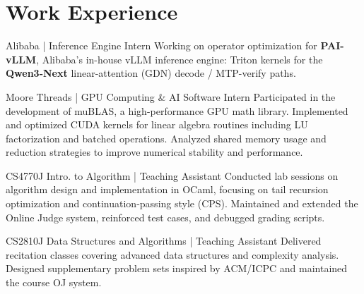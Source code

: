 
\section{Work Experience}

\begin{jobshort}{Alibaba | Inference Engine Intern}{\DateAlibabaEn}
Working on operator optimization for \textbf{PAI-vLLM}, Alibaba's in-house vLLM inference engine: Triton kernels for the \textbf{Qwen3-Next} linear-attention (GDN) decode / MTP-verify paths.
\end{jobshort}

\begin{jobshort}{Moore Threads | GPU Computing \& AI Software Intern}{\DateMooreEn}
Participated in the development of muBLAS, a high-performance GPU math library. 
Implemented and optimized CUDA kernels for linear algebra routines including LU factorization and batched operations. 
Analyzed shared memory usage and reduction strategies to improve numerical stability and performance.
\end{jobshort}

\begin{jobshort}{CS4770J Intro. to Algorithm | Teaching Assistant}{\DateTAEn}
Conducted lab sessions on algorithm design and implementation in OCaml, focusing on tail recursion optimization and continuation-passing style (CPS). 
Maintained and extended the Online Judge system, reinforced test cases, and debugged grading scripts.
\end{jobshort}

\begin{jobshort}{CS2810J Data Structures and Algorithms | Teaching Assistant}{\DateTAEn}
Delivered recitation classes covering advanced data structures and complexity analysis. 
Designed supplementary problem sets inspired by ACM/ICPC and maintained the course OJ system.
\end{jobshort}



